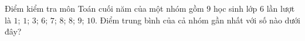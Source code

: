 \begin{ex}
Điểm kiểm tra môn Toán cuối năm của một nhóm gồm $9$ học sinh lớp 6 lần lượt là $1$; $1$; $3$; $6$; $7$; $8$; $8$; $9$; $10$. Điểm trung bình của cả nhóm gần nhất với số nào dưới đây?
\end{ex}
